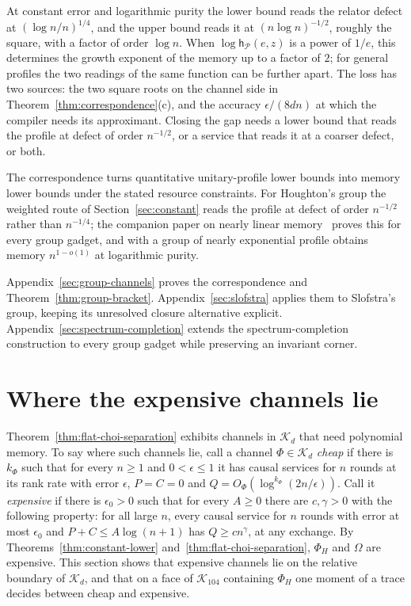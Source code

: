 \documentclass[11pt,a4paper]{article}
\theoremstyle{plain}
\theoremstyle{definition}
\theoremstyle{remark}
\begin{document}
At constant error and logarithmic purity the lower bound reads the relator defect at $(\log n/n)^{1/4}$, and the upper bound reads it at
$(n\log n)^{-1/2}$, roughly the square, with a factor of order $\log n$. When $\log\mathsf h_{\mathcal P}(e,z)$ is a power of $1/e$, this determines the growth
exponent of the memory up to a factor of $2$; for general profiles the two readings of the same function can be further apart. The loss has two
sources: the two square roots on the channel side in Theorem~\ref{thm:correspondence}(c), and the accuracy $\epsilon/(8dn)$ at which the compiler needs
its approximant. Closing the gap needs a lower bound that reads the profile at defect of order $n^{-1/2}$, or a service that reads it at a coarser
defect, or both.

The correspondence turns quantitative unitary-profile lower bounds into memory lower bounds under the stated resource constraints. For
Houghton's group the weighted route of Section~\ref{sec:constant} reads the profile at defect of order $n^{-1/2}$ rather than $n^{-1/4}$; the
companion paper on nearly linear memory~\cite{DouglasMghirbiC} proves this for every group gadget, and with a group of nearly exponential profile
obtains memory $n^{1-o(1)}$ at logarithmic purity.


Appendix~\ref{sec:group-channels} proves the correspondence and
Theorem~\ref{thm:group-bracket}. Appendix~\ref{sec:slofstra} applies them to
Slofstra's group, keeping its unresolved closure alternative explicit.
Appendix~\ref{sec:spectrum-completion} extends the spectrum-completion
construction to every group gadget while preserving an invariant corner.


\section{Where the expensive channels lie}\label{sec:where}

Theorem~\ref{thm:flat-choi-separation} exhibits channels in $\mathcal K_d$ that need polynomial memory. To say where such channels lie, call a
channel $\Phi\in\mathcal K_d$ \emph{cheap} if there is $k_\Phi$ such that for every $n\ge1$ and $0<\epsilon\le1$ it has causal services for $n$
rounds at its rank rate with error $\epsilon$, $P=C=0$ and $Q=O_\Phi(\log^{k_\Phi}(2n/\epsilon))$. Call it \emph{expensive} if there is $\epsilon_0>0$ such that for every $A\ge0$ there are $c,\gamma>0$ with the
following property: for all large $n$, every causal service for $n$ rounds with error at most $\epsilon_0$ and $P+C\le A\log(n+1)$ has
$Q\ge cn^\gamma$, at any exchange. By Theorems~\ref{thm:constant-lower} and~\ref{thm:flat-choi-separation}, $\Phi_H$ and $\Omega$ are expensive. This
section shows that expensive channels lie on the relative boundary of $\mathcal K_d$, and that on a face of $\mathcal K_{104}$ containing $\Phi_H$
one moment of a trace decides between cheap and expensive.
\end{document}
